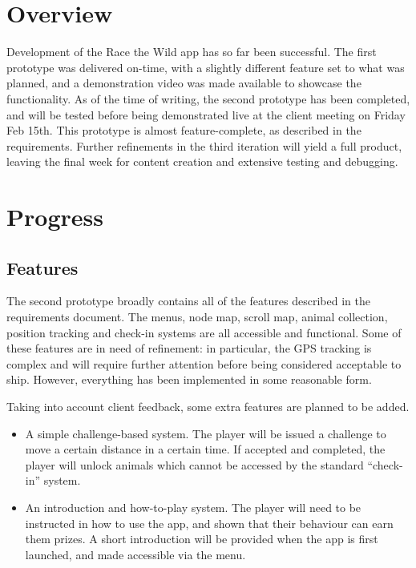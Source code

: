 \documentclass[12pt,a4paper,twoside]{article}
\begin{document}

\newpage
\pagestyle{empty}
\cleardoublepage                             %
\newpage

\section{Overview}

Development of the Race the Wild app has so far been successful. 
The first prototype was delivered on-time, with a slightly different feature set to what was planned, and a demonstration video was made available to showcase the functionality. 
As of the time of writing, the second prototype has been completed, and will be tested before being demonstrated live at the client meeting on Friday Feb 15th. 
This prototype is almost feature-complete, as described in the requirements. 
Further refinements in the third iteration will yield a full product, leaving the final week for content creation and extensive testing and debugging.

\section{Progress}

\subsection{Features}

The second prototype broadly contains all of the features described in the requirements document. 
The menus, node map, scroll map, animal collection, position tracking and check-in systems are all accessible and functional. 
Some of these features are in need of refinement: in particular, the GPS tracking is complex and will require further attention before being considered acceptable to ship. 
However, everything has been implemented in some reasonable form.

Taking into account client feedback, some extra features are planned to be added.
\begin{itemize}
\item A simple challenge-based system. 
The player will be issued a challenge to move a certain distance in a certain time. 
If accepted and completed, the player will unlock animals which cannot be accessed by the standard ``check-in'' system.
\item An introduction and how-to-play system. 
The player will need to be instructed in how to use the app, and shown that their behaviour can earn them prizes. 
A short introduction will be provided when the app is first launched, and made accessible via the menu.
\end{itemize}
\end{document}

